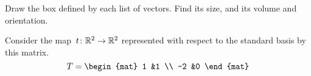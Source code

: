 \documentclass[noanswers, nolegalese, 11pt]{examjh}
\begin{document}
\begin{questions}
\question
Draw the box defined by each list of vectors.
Find its size, and its volume and orientation.

\question
Consider the map~$\mbox{$t\colon \mathbb{R}^2\to \mathbb{R}^2$}$ 
represented with respect to the standard basis by this
matrix.
\begin{equation*}
  T=
  \begin{mat}
  1  &1  \\
  -2  &0
  \end{mat}
\end{equation*}
\end{questions}
\end{document}
